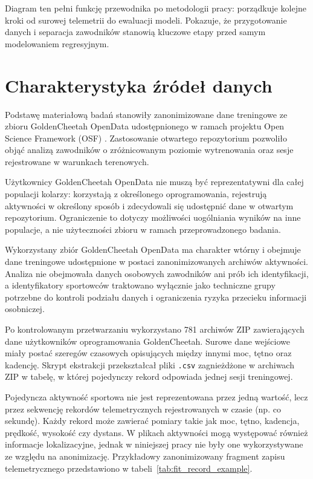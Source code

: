 Diagram ten pełni funkcję przewodnika po metodologii pracy: porządkuje kolejne kroki od surowej telemetrii do ewaluacji modeli. Pokazuje, że przygotowanie danych i separacja zawodników stanowią kluczowe etapy przed samym modelowaniem regresyjnym.

\section{Charakterystyka źródeł danych}

Podstawę materiałową badań stanowiły zanonimizowane dane treningowe ze zbioru GoldenCheetah OpenData udostępnionego w ramach projektu Open Science Framework (OSF) \parencite{osf_goldencheetah_opendata}. Zastosowanie otwartego repozytorium pozwoliło objąć analizą zawodników o zróżnicowanym poziomie wytrenowania oraz sesje rejestrowane w warunkach terenowych.

Użytkownicy GoldenCheetah OpenData nie muszą być reprezentatywni dla całej populacji kolarzy: korzystają z określonego oprogramowania, rejestrują aktywności w określony sposób i zdecydowali się udostępnić dane w otwartym repozytorium. Ograniczenie to dotyczy możliwości uogólniania wyników na inne populacje, a nie użyteczności zbioru w ramach przeprowadzonego badania.

Wykorzystany zbiór GoldenCheetah OpenData ma charakter wtórny i obejmuje dane treningowe udostępnione w postaci zanonimizowanych archiwów aktywności. Analiza nie obejmowała danych osobowych zawodników ani prób ich identyfikacji, a identyfikatory sportowców traktowano wyłącznie jako techniczne grupy potrzebne do kontroli podziału danych i ograniczenia ryzyka przecieku informacji osobniczej.

Po kontrolowanym przetwarzaniu wykorzystano 781 archiwów ZIP zawierających dane użytkowników oprogramowania GoldenCheetah. Surowe dane wejściowe miały postać szeregów czasowych opisujących między innymi moc, tętno oraz kadencję. Skrypt ekstrakcji przekształcał pliki \texttt{.csv} zagnieżdżone w archiwach ZIP w tabelę, w której pojedynczy rekord odpowiada jednej sesji treningowej.

Pojedyncza aktywność sportowa nie jest reprezentowana przez jedną wartość, lecz przez sekwencję rekordów telemetrycznych rejestrowanych w czasie (np. co sekundę). Każdy rekord może zawierać pomiary takie jak moc, tętno, kadencja, prędkość, wysokość czy dystans. W plikach aktywności mogą występować również informacje lokalizacyjne, jednak w niniejszej pracy nie były one wykorzystywane ze względu na anonimizację. Przykładowy zanonimizowany fragment zapisu telemetrycznego przedstawiono w tabeli~\ref{tab:fit_record_example}.

